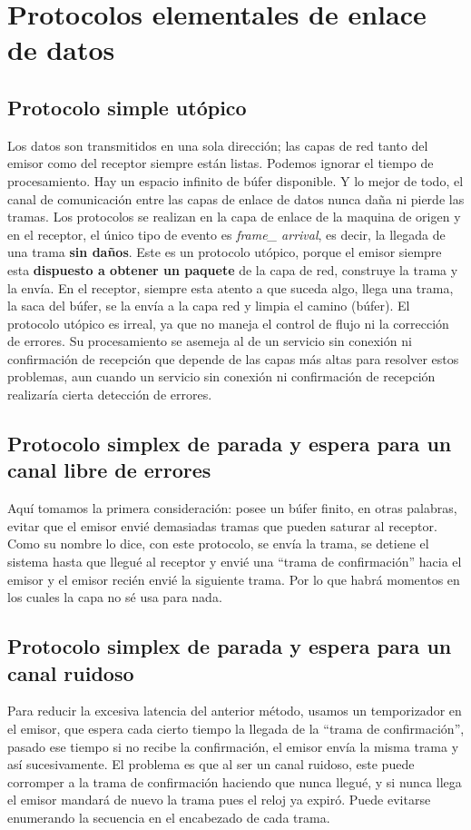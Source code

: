 \documentclass[
	12pt, %
	fleqn, %
	a4paper, %
]{LegrandOrangeBook}
\begin{document}
\section{Protocolos elementales de enlace de datos}
\subsection{Protocolo simple utópico}
Los datos son transmitidos en una sola dirección; las capas de red tanto del emisor como del receptor siempre están listas. Podemos ignorar el tiempo de procesamiento. Hay un espacio infinito de búfer disponible. Y lo mejor de todo, el canal de comunicación entre las capas de enlace de datos nunca daña ni pierde las tramas. Los protocolos se realizan en la capa de enlace de la maquina de origen y en el receptor, el único tipo de evento es \textit{frame\_ arrival}, es decir, la llegada de una trama \textbf{sin daños}. Este es un protocolo utópico, porque el emisor siempre esta \textbf{dispuesto a obtener un paquete} de la capa de red, construye la trama y la envía. En el receptor, siempre esta atento a que suceda algo, llega una trama, la saca del búfer, se la envía  a la capa red y limpia el camino (búfer). El protocolo utópico es irreal, ya que no maneja el control de flujo ni la corrección de errores. Su procesamiento se asemeja al de un servicio sin conexión ni confirmación de recepción que depende de las capas más altas para resolver estos problemas, aun cuando un servicio sin conexión ni confirmación de recepción realizaría cierta detección de errores.
\subsection{Protocolo simplex de parada y espera para un canal libre de errores}
Aquí tomamos la primera consideración: posee un búfer finito, en otras palabras, evitar que el emisor envié demasiadas tramas que pueden saturar al receptor. Como su nombre lo dice, con este protocolo, se envía la trama, se detiene el sistema hasta que llegué al receptor y envié una ``trama de confirmación'' hacia el emisor y el emisor recién envié la siguiente trama. Por lo que habrá momentos en los cuales la capa no sé usa para nada.
\subsection{Protocolo simplex de parada y espera para un canal ruidoso}
Para reducir la excesiva latencia del anterior método, usamos un temporizador en el emisor, que espera cada cierto tiempo la llegada de la ``trama de confirmación'', pasado ese tiempo si no recibe la confirmación, el emisor envía la misma trama y así sucesivamente. El problema es que al ser un canal ruidoso, este puede corromper a la trama de confirmación haciendo que nunca llegué, y si nunca llega el emisor mandará de nuevo la trama pues el reloj ya expiró. Puede evitarse enumerando la secuencia en el encabezado de cada trama.
\end{document}
